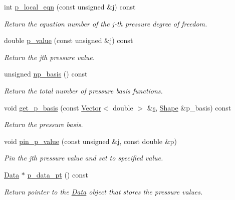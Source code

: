 \begin{DoxyCompactItemize}
int \hyperlink{classoomph_1_1TAxisymmetricPoroelasticityElement_aaa12fb476f9f78e519f5fa96b065a439}{p\+\_\+local\+\_\+eqn} (const unsigned \&j) const
\begin{DoxyCompactList}\small\item\em Return the equation number of the j-\/th pressure degree of freedom. \end{DoxyCompactList}\item 
double \hyperlink{classoomph_1_1TAxisymmetricPoroelasticityElement_a4fd508fc048ef38ab6cd288d58a84d13}{p\+\_\+value} (const unsigned \&j) const
\begin{DoxyCompactList}\small\item\em Return the jth pressure value. \end{DoxyCompactList}\item 
unsigned \hyperlink{classoomph_1_1TAxisymmetricPoroelasticityElement_ae1fdf6e051bbc93b8c485f1d3f9fb9c6}{np\+\_\+basis} () const
\begin{DoxyCompactList}\small\item\em Return the total number of pressure basis functions. \end{DoxyCompactList}\item 
void \hyperlink{classoomph_1_1TAxisymmetricPoroelasticityElement_a12e958b84334c6e47e0511ff1f08f13d}{get\+\_\+p\+\_\+basis} (const \hyperlink{classoomph_1_1Vector}{Vector}$<$ double $>$ \&\hyperlink{cfortran_8h_ab7123126e4885ef647dd9c6e3807a21c}{s}, \hyperlink{classoomph_1_1Shape}{Shape} \&p\+\_\+basis) const
\begin{DoxyCompactList}\small\item\em Return the pressure basis. \end{DoxyCompactList}\item 
void \hyperlink{classoomph_1_1TAxisymmetricPoroelasticityElement_a8b8bc5b1b5234116a5129f0f9ef4d463}{pin\+\_\+p\+\_\+value} (const unsigned \&j, const double \&p)
\begin{DoxyCompactList}\small\item\em Pin the jth pressure value and set to specified value. \end{DoxyCompactList}\item 
\hyperlink{classoomph_1_1Data}{Data} $\ast$ \hyperlink{classoomph_1_1TAxisymmetricPoroelasticityElement_a8442be1bbcd76fddaa91fc674785e3ea}{p\+\_\+data\+\_\+pt} () const
\begin{DoxyCompactList}\small\item\em Return pointer to the \hyperlink{classoomph_1_1Data}{Data} object that stores the pressure values. \end{DoxyCompactList}\item 

\end{DoxyCompactItemize}
